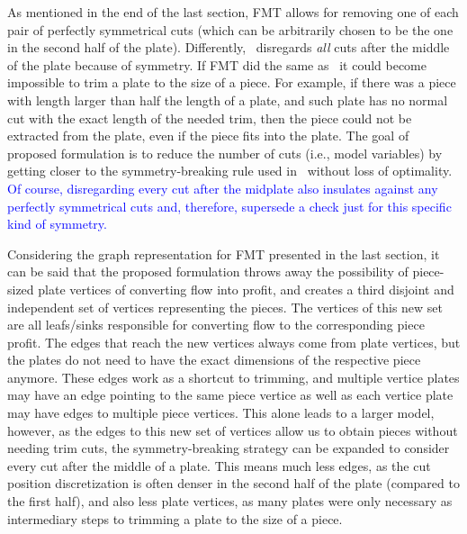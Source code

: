 \documentclass[ppgc,tese,english,formais,babel]{iiufrgs}
\newif\iffinalversion
\newcommand{\newtext}[1]{\iffinalversion%
#1%
\else%
\textcolor{blue}{#1}%
\fi%
}
\begin{document}

As mentioned in the end of the last section, FMT allows for removing one of each pair of perfectly symmetrical cuts (which can be arbitrarily chosen to be the one in the second half of the plate).
Differently,~\citet{cw:1977} disregards \emph{all} cuts after the middle of the plate because of symmetry.
If FMT did the same as~\citet{cw:1977} it could become impossible to trim a plate to the size of a piece.
For example, if there was a piece with length larger than half the length of a plate, and such plate has no normal cut with the exact length of the needed trim, then the piece could not be extracted from the plate, even if the piece fits into the plate.
The goal of proposed formulation is to reduce the number of cuts (i.e., model variables) by getting closer to the symmetry-breaking rule used in~\citet{cw:1977} without loss of optimality.
\newtext{Of course, disregarding every cut after the midplate also insulates against any perfectly symmetrical cuts and, therefore, supersede a check just for this specific kind of symmetry.}

Considering the graph representation for FMT presented in the last section, it can be said that the proposed formulation throws away the possibility of piece-sized plate vertices of converting flow into profit, and creates a third disjoint and independent set of vertices representing the pieces.
The vertices of this new set are all leafs/sinks responsible for converting flow to the corresponding piece profit.
The edges that reach the new vertices always come from plate vertices, but the plates do not need to have the exact dimensions of the respective piece anymore.
These edges work as a shortcut to trimming, and multiple vertice plates may have an edge pointing to the same piece vertice as well as each vertice plate may have edges to multiple piece vertices.
This alone leads to a larger model, however, as the edges to this new set of vertices allow us to obtain pieces without needing trim cuts, the symmetry-breaking strategy can be expanded to consider every cut after the middle of a plate.
This means much less edges, as the cut position discretization is often denser in the second half of the plate (compared to the first half), and also less plate vertices, as many plates were only necessary as intermediary steps to trimming a plate to the size of a piece.
\end{document}
